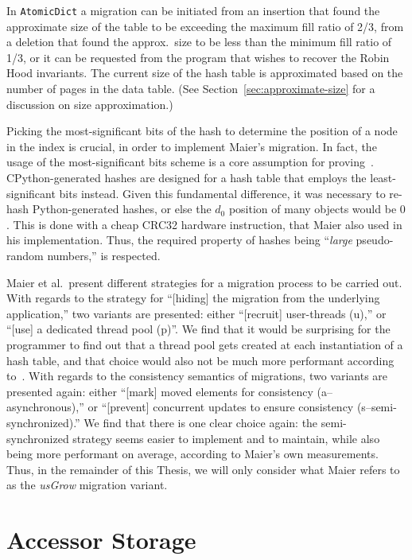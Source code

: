In \texttt{AtomicDict} a migration can be initiated from an insertion that found the approximate size of the table to be exceeding the maximum fill ratio of 2/3, from a deletion that found the approx.\ size to be less than the minimum fill ratio of 1/3, or it can be requested from the program that wishes to recover the Robin Hood invariants.
The current size of the hash table is approximated based on the number of pages in the data table.
(See Section~\ref{sec:approximate-size} for a discussion on size approximation.)

Picking the most-significant bits of the hash to determine the position of a node in the index is crucial, in order to implement Maier's migration.
In fact, the usage of the most-significant bits scheme is a core assumption for proving~\cite[Lemma~5.1]{maier}.
CPython-generated hashes are designed for a hash table that employs the least-significant bits instead.
Given this fundamental difference, it was necessary to re-hash Python-generated hashes, or else the $d_0$ position of many objects would be $0$.
This is done with a cheap CRC32 hardware instruction, that Maier also used in his implementation.
Thus, the required property of hashes being ``\emph{large} pseudo-random numbers,'' is respected.

Maier et al.\ present different strategies for a migration process to be carried out.
With regards to the strategy for ``[hiding] the migration from the underlying application,'' two variants are presented: either ``[recruit] user-threads (u),'' or ``[use] a dedicated thread pool (p)''.
We find that it would be surprising for the programmer to find out that a thread pool gets created at each instantiation of a hash table, and that choice would also not be much more performant according to~\cite[\S8.4, Using Dedicated Growing Threads]{maier}.
With regards to the consistency semantics of migrations, two variants are presented again: either ``[mark] moved elements for consistency (a--asynchronous),'' or ``[prevent] concurrent updates to ensure consistency (s--semi-synchronized).''
We find that there is one clear choice again: the semi-synchronized strategy seems easier to implement and to maintain, while also being more performant on average, according to Maier's own measurements.
Thus, in the remainder of this Thesis, we will only consider what Maier refers to as the \emph{usGrow} migration variant.


\section{Accessor Storage}\label{sec:accessor-storage}

